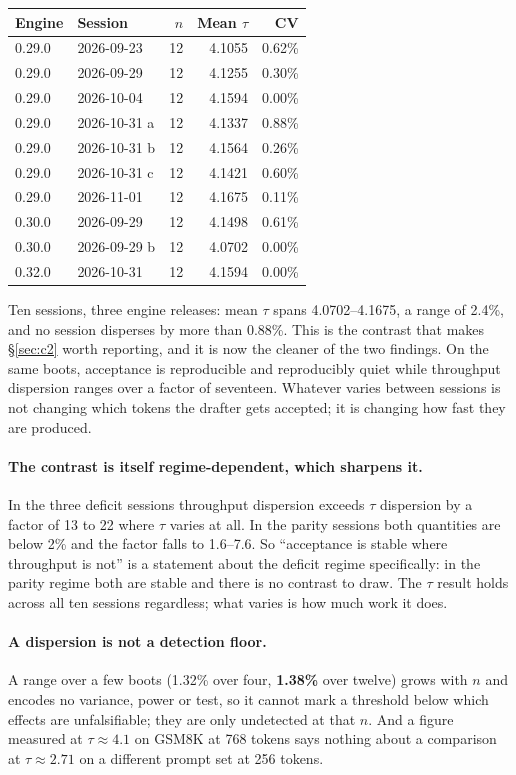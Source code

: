 \documentclass[11pt]{article}
\begin{document}
\begin{center}\small
\begin{tabular}{llrrr}
\toprule
Engine & Session & $n$ & Mean $\tau$ & CV\\
\midrule
0.29.0 & 2026-09-23 & 12 & 4.1055 & 0.62\%\\
0.29.0 & 2026-09-29 & 12 & 4.1255 & 0.30\%\\
0.29.0 & 2026-10-04 & 12 & 4.1594 & 0.00\%\\
0.29.0 & 2026-10-31 a & 12 & 4.1337 & 0.88\%\\
0.29.0 & 2026-10-31 b & 12 & 4.1564 & 0.26\%\\
0.29.0 & 2026-10-31 c & 12 & 4.1421 & 0.60\%\\
0.29.0 & 2026-11-01 & 12 & 4.1675 & 0.11\%\\
0.30.0 & 2026-09-29 & 12 & 4.1498 & 0.61\%\\
0.30.0 & 2026-09-29 b & 12 & 4.0702 & 0.00\%\\
0.32.0 & 2026-10-31 & 12 & 4.1594 & 0.00\%\\
\bottomrule
\end{tabular}
\end{center}

\noindent
Ten sessions, three engine releases: mean $\tau$ spans 4.0702--4.1675, a
range of 2.4\%, and no session disperses by more than 0.88\%. This is the contrast that makes \S\ref{sec:c2} worth
reporting, and it is now the cleaner of the two findings. On the same boots,
acceptance is reproducible and reproducibly quiet while throughput dispersion
ranges over a factor of seventeen. Whatever varies between sessions is not
changing which tokens the drafter gets accepted; it is changing how fast they
are produced.

\paragraph{The contrast is itself regime-dependent, which sharpens it.} In
the three deficit sessions throughput dispersion exceeds $\tau$ dispersion by
a factor of 13 to 22 where $\tau$ varies at all. In the parity sessions both
quantities are below 2\% and the factor falls to 1.6--7.6. So ``acceptance is stable where throughput
is not'' is a statement about the deficit regime specifically: in the parity
regime both are stable and there is no contrast to draw. The $\tau$ result
holds across all ten sessions regardless; what varies is how much work it
does.

\paragraph{A dispersion is not a detection floor.} A range over a few boots
(1.32\% over four, \textbf{1.38\%} over twelve) grows with $n$ and encodes no
variance, power or test, so it cannot mark a threshold below which effects
are unfalsifiable; they are only undetected at that $n$. And a figure
measured at $\tau \approx 4.1$ on GSM8K at 768 tokens says nothing about a
comparison at $\tau \approx 2.71$ on a different prompt set at 256 tokens.
\end{document}
